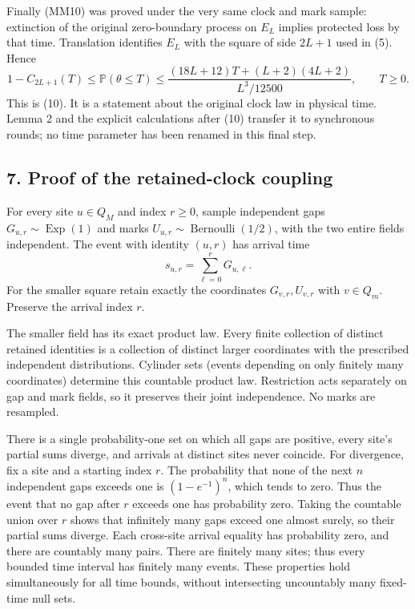 \documentclass[
  11pt,
  a4paper,
]{article}
\begin{document}
Finally (MM10) was proved under the very same clock and mark sample:
extinction of the original zero-boundary process on \(E_L\) implies
protected loss by that time. Translation identifies \(E_L\) with the
square of side \(2L+1\) used in (5). Hence \[
1-C_{2L+1}(T)
\leq\mathbb P(\theta\leq T)
\leq\frac{(18L+12)T+(L+2)(4L+2)}{L^3/12500},
\qquad T\geq0.
\tag{LT6}
\] This is (10). It is a statement about the original clock law in
physical time. Lemma 2 and the explicit calculations after (10) transfer
it to synchronous rounds; no time parameter has been renamed in this
final step.

\subsection{7. Proof of the retained-clock
coupling}\label{proof-of-the-retained-clock-coupling}

For every site \(u\in Q_M\) and index \(r\geq0\), sample independent
gaps \(G_{u,r}\sim\operatorname{Exp}(1)\) and marks
\(U_{u,r}\sim\operatorname{Bernoulli}(1/2)\), with the two entire fields
independent. The event with identity \((u,r)\) has arrival time \[
s_{u,r}=\sum_{\ell=0}^{r}G_{u,\ell}.
\] For the smaller square retain exactly the coordinates
\(G_{v,r},U_{v,r}\) with \(v\in Q_m\). Preserve the arrival index \(r\).

The smaller field has its exact product law. Every finite collection of
distinct retained identities is a collection of distinct larger
coordinates with the prescribed independent distributions. Cylinder sets
(events depending on only finitely many coordinates) determine this
countable product law. Restriction acts separately on gap and mark
fields, so it preserves their joint independence. No marks are
resampled.

There is a single probability-one set on which all gaps are positive,
every site's partial sums diverge, and arrivals at distinct sites never
coincide. For divergence, fix a site and a starting index \(r\). The
probability that none of the next \(n\) independent gaps exceeds one is
\((1-e^{-1})^n\), which tends to zero. Thus the event that no gap after
\(r\) exceeds one has probability zero. Taking the countable union over
\(r\) shows that infinitely many gaps exceed one almost surely, so their
partial sums diverge. Each cross-site arrival equality has probability
zero, and there are countably many pairs. There are finitely many sites;
thus every bounded time interval has finitely many events. These
properties hold simultaneously for all time bounds, without intersecting
uncountably many fixed-time null sets.
\end{document}
